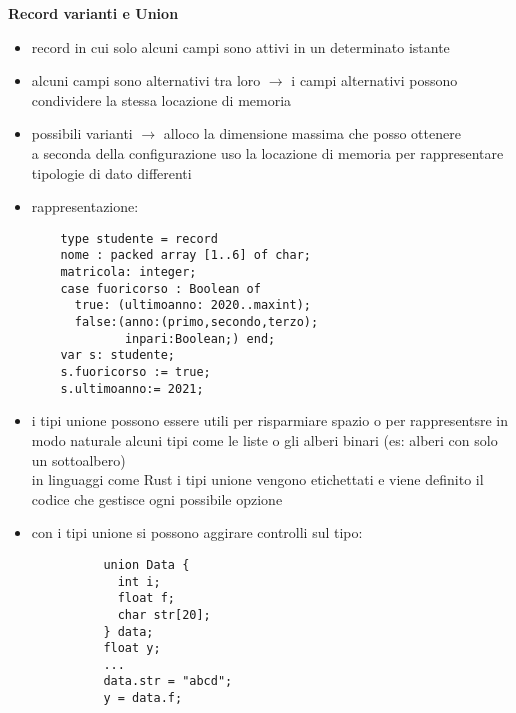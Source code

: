 \documentclass{article}
\begin{document}
\begin{flushleft}
\newpage

\textbf{Record varianti e Union}

\begin{itemize}
  \item record in cui solo alcuni campi sono attivi in un determinato istante
  \item alcuni campi sono alternativi tra loro $\rightarrow$  i campi alternativi possono condividere la stessa locazione di memoria
  \item possibili varianti $\rightarrow$  alloco la dimensione massima che posso ottenere \\
        a seconda della configurazione uso la locazione di memoria per rappresentare tipologie di dato differenti
  \item rappresentazione:
  \begin{lstlisting}
    type studente = record
    nome : packed array [1..6] of char;
    matricola: integer;
    case fuoricorso : Boolean of
      true: (ultimoanno: 2020..maxint);
      false:(anno:(primo,secondo,terzo);
             inpari:Boolean;) end;
    var s: studente;
    s.fuoricorso := true;
    s.ultimoanno:= 2021;
\end{lstlisting}
  \item i tipi unione possono essere utili per risparmiare spazio o per rappresentsre in modo naturale 
        alcuni tipi come le liste o gli alberi binari (es: alberi con solo un sottoalbero) \\
        in linguaggi come Rust i tipi unione vengono etichettati e viene definito il codice 
        che gestisce ogni possibile opzione
  \item con i tipi unione si possono aggirare controlli sul tipo:
        \begin{lstlisting}
          union Data {
            int i;
            float f;
            char str[20];
          } data;
          float y;
          ...
          data.str = "abcd";
          y = data.f;
        \end{lstlisting}
\end{itemize}


\end{flushleft}
\end{document}
